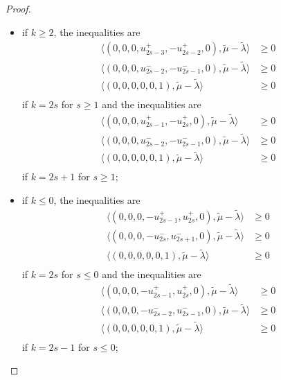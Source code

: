 \documentclass{amsart}
\numberwithin{theorem}{section}
\begin{document}
  \begin{proof}
    \begin{itemize}
      \item if $k\ge 2$, the inequalities are
        \begin{align*}
          \langle (0,0,0,u_{2s-3}^+,-u_{2s-2}^+,0), \tilde\mu - \tilde\lambda\rangle &\ge 0\\ 
          \langle (0,0,0,u_{2s-2}^-,-u_{2s-1}^-,0), \tilde\mu - \tilde\lambda\rangle &\ge 0\\ 
          \langle (0,0,0,0,0,1), \tilde\mu - \tilde\lambda\rangle &\ge 0\\ 
        \end{align*}
        if $k=2s$ for $s\ge1$ and the inequalities are
        \begin{align*}
          \langle (0,0,0,u_{2s-1}^+,-u_{2s}^+,0), \tilde\mu - \tilde\lambda\rangle &\ge 0\\ 
          \langle (0,0,0,u_{2s-2}^-,-u_{2s-1}^-,0), \tilde\mu - \tilde\lambda\rangle &\ge 0\\ 
          \langle (0,0,0,0,0,1), \tilde\mu - \tilde\lambda\rangle &\ge 0\\ 
        \end{align*}
        if $k=2s+1$ for $s\ge1$;
      \item if $k\le 0$, the inequalities are
        \begin{align*}
          \langle (0,0,0,-u_{2s-1}^+,u_{2s}^+,0), \tilde\mu - \tilde\lambda\rangle &\ge 0\\ 
          \langle (0,0,0,-u_{2s}^-,u_{2s+1}^-,0), \tilde\mu - \tilde\lambda\rangle &\ge 0\\ 
          \langle (0,0,0,0,0,1), \tilde\mu - \tilde\lambda\rangle &\ge 0\\ 
        \end{align*}
        if $k=2s$ for $s\le0$ and the inequalities are
        \begin{align*}
          \langle (0,0,0,-u_{2s-1}^+,u_{2s}^+,0), \tilde\mu - \tilde\lambda\rangle &\ge 0\\ 
          \langle (0,0,0,-u_{2s-2}^-,u_{2s-1}^-,0), \tilde\mu - \tilde\lambda\rangle &\ge 0\\ 
          \langle (0,0,0,0,0,1), \tilde\mu - \tilde\lambda\rangle &\ge 0\\ 
        \end{align*}
        if $k=2s-1$ for $s\le0$;
    \end{itemize}
  \end{proof}
\end{document}
